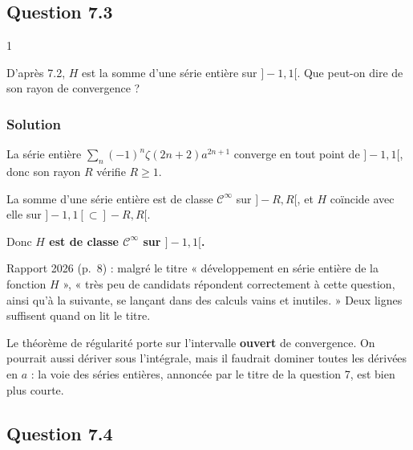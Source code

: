 \documentclass[11pt,a4paper]{article}
\begin{document}
\hypertarget{question-7.3}{%
\subsection{Question 7.3}\label{question-7.3}}

\begin{indication}{1}

D'après 7.2, \(H\) est la somme d'une série entière sur \(]-1,1[\). Que peut-on dire de son rayon de convergence ?

\end{indication}

\hypertarget{solution-19}{%
\subsubsection{Solution}\label{solution-19}}

La série entière \(\sum_n(-1)^n\zeta(2n+2)a^{2n+1}\) converge en tout point de \(]-1,1[\), donc son rayon \(R\) vérifie \(R\ge 1\).

La somme d'une série entière est de classe \(\mathcal C^\infty\) sur \(]-R,R[\), et \(H\) coïncide avec elle sur \(]-1,1[\subset]-R,R[\).

Donc \textbf{\(H\) est de classe \(\mathcal C^\infty\) sur \(]-1,1[\).}

\begin{jury}

Rapport 2026 (p.~8) : malgré le titre « développement en série entière de la fonction \(H\) », « très peu de candidats répondent correctement à cette question, ainsi qu'à la suivante, se lançant dans des calculs vains et inutiles. » Deux lignes suffisent quand on lit le titre.

\end{jury}

\begin{methode}

Le théorème de régularité porte sur l'intervalle \textbf{ouvert} de convergence. On pourrait aussi dériver sous l'intégrale, mais il faudrait dominer toutes les dérivées en \(a\) : la voie des séries entières, annoncée par le titre de la question 7, est bien plus courte.

\end{methode}

\hypertarget{question-7.4}{%
\subsection{Question 7.4}\label{question-7.4}}
\end{document}
